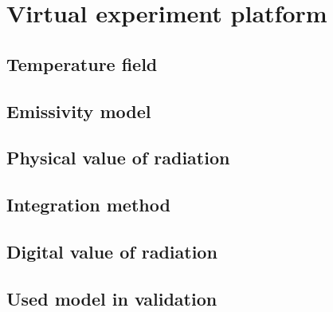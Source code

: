\chapter{Virtual experiment platform}%

%
%
\section{Temperature field}%

%
%
\section{Emissivity model}%

%
%
\section{Physical value of radiation}%

%
%
\section{Integration method}%

%
%
\section{Digital value of radiation}%

%
%
\section{Used model in validation}%

%
%
